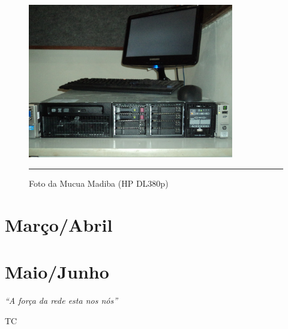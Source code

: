 \documentclass[a4paper, 11pt, oneside]{Relatorio_sem_2}  %
\begin{document}
\begin{figure}[htbp]
  \centering
  \includegraphics[width=0.8\textwidth]{./Fig/DL380P_2.pdf}
  \rule{35em}{0.5pt}
  \caption[Foto da Mucua Madiba (HP DL380p)]{Foto da Mucua Madiba (HP DL380p)}
  \label{fig:MucuaMadiba2}
\end{figure}



\part{Março/Abril} %


\part{Maio/Junho} %





\clearpage  %

\pagestyle{empty}  %

\null\vfill
\textit{``A força da rede esta nos nós''}

\begin{flushright}
TC
\end{flushright}

\vfill\vfill\vfill\vfill\vfill\vfill\null
\clearpage  %
\end{document}
